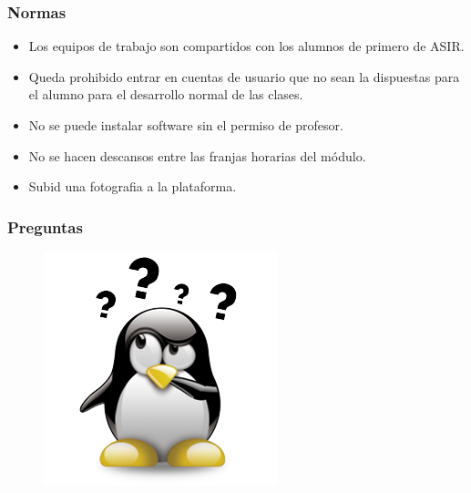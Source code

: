 \documentclass{beamer}
\begin{document}
\begin{frame}
\frametitle{Normas}

\begin{itemize}[<+-| alert@+>]
\item Los equipos de trabajo son compartidos con los alumnos de primero de ASIR.
\item Queda prohibido entrar en cuentas de usuario que no sean la dispuestas para el alumno para el desarrollo normal de las clases.
\item No se puede instalar software sin el permiso de profesor.
\item No se hacen descansos entre las franjas horarias del módulo.
\item Subid una fotografia a la plataforma.
\end{itemize}
\pause
\end{frame}


\begin{frame}
\frametitle{Preguntas} 
\begin{figure}
\includegraphics[scale=0.9]{tercera_evaluacion/jdbc/imagenes/dudas.png} 
\end{figure} 
\end{frame}
\end{document}

